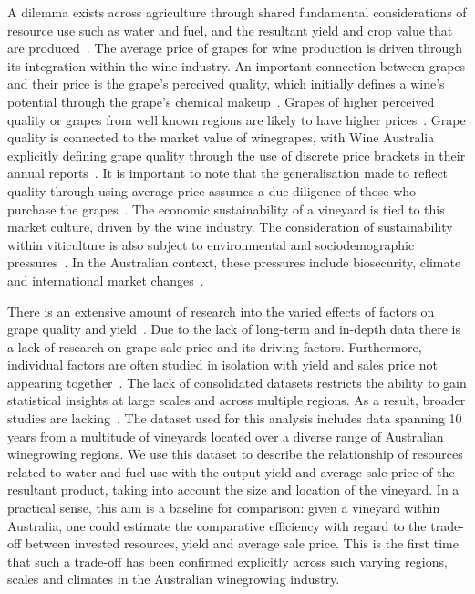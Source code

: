\documentclass[10pt,letterpaper]{article}
\begin{document}
A dilemma exists across agriculture through shared fundamental considerations of resource use such as water and fuel, and the resultant yield and crop value that are produced~\cite{hemmingCherryTomatoProduction2020,kawasakiQualityMattersMore2016, zhuEffectsNitrogenLevel2017}. The average price of grapes for wine production is driven through its integration within the wine industry. An important connection between grapes and their price is the grape's perceived quality, which initially defines a wine's potential through the grape's chemical makeup~\cite{blackTerpenoidsTheirRole2015,schreierFlavorCompositionWines1979}. Grapes of higher perceived quality or grapes from well known regions are likely to have higher prices~\cite{wineaustraliaNationalVintageReport2021}.  Grape quality is connected to the market value of winegrapes, with Wine Australia explicitly defining grape quality through the use of discrete price brackets in their annual reports~\cite{winemakersfederationofaustraliaNationalVintageReport2018}. It is important to note that the generalisation made to reflect quality through using average price assumes a due diligence of those who purchase the grapes~\cite{yeggeInfluenceSensoryNonsensory2001}. The economic sustainability of a vineyard is tied to this market culture, driven by the wine industry. The consideration of sustainability within viticulture is also subject to environmental and sociodemographic pressures~\cite{santiago-brownSustainabilityAssessmentWineGrape2015}. In the Australian context, these pressures include biosecurity, climate and international market changes~\cite{canadellMultidecadalIncreaseForest2021,longbottomRoleVineyardPractices2015,oliverReviewSoilPhysical2013}.
\par
There is an extensive amount of research into the varied effects of factors on grape quality and yield~\cite{heFruitYieldPrediction2022,laurentLocalInfluenceClimate2022,liakosMachineLearningAgriculture2018}. Due to the lack of long-term and in-depth data there is a lack of research on grape sale price and its driving factors. Furthermore, individual factors are often studied in isolation with yield and sales price not appearing together~\cite{abbalDecisionSupportSystem2016}. The lack of consolidated datasets restricts the ability to gain statistical insights at large scales and across multiple regions. As a result, broader studies are lacking~\cite{keithjonesAustralianWineIndustry2002,knightFirmResourcesDevelopment2019}. The dataset used for this analysis includes data spanning 10 years from a multitude of vineyards located over a diverse range of Australian winegrowing regions. We use this dataset to describe the relationship of resources related to water and fuel use with the output yield and average sale price of the resultant product, taking into account the size and location of the vineyard. In a practical sense, this aim is a baseline for comparison: given a vineyard within Australia, one could estimate the comparative efficiency with regard to the trade-off between invested resources, yield and average sale price. This is the first time that such a trade-off has been confirmed explicitly across such varying regions, scales and climates in the Australian winegrowing industry.
\end{document}
